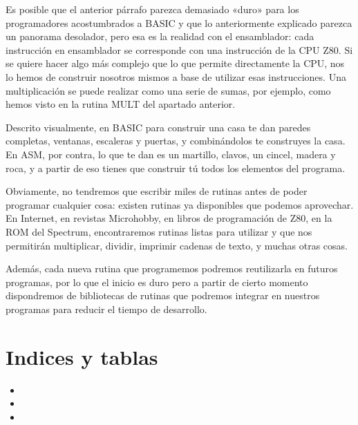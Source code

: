\documentclass[letterpaper,10pt,spanish]{sphinxmanual}
\begin{document}
Es posible que el anterior párrafo parezca demasiado «duro» para los programadores acostumbrados a BASIC y que lo anteriormente explicado parezca un panorama desolador, pero esa es la realidad con el ensamblador: cada instrucción en ensamblador se corresponde con una instrucción de la CPU Z80. Si se quiere hacer algo más complejo que lo que permite directamente la CPU, nos lo hemos de construir nosotros mismos a base de utilizar esas instrucciones. Una multiplicación se puede realizar como una serie de sumas, por ejemplo, como hemos visto en la rutina MULT del apartado anterior.

Descrito visualmente, en BASIC para construir una casa te dan paredes completas, ventanas, escaleras y puertas, y combinándolos te construyes la casa. En ASM, por contra, lo que te dan es un martillo, clavos, un cincel, madera y roca, y a partir de eso tienes que construir tú todos los elementos del programa.

Obviamente, no tendremos que escribir miles de rutinas antes de poder programar cualquier cosa: existen rutinas ya disponibles que podemos aprovechar. En Internet, en revistas Microhobby, en libros de programación de Z80, en la ROM del Spectrum, encontraremos rutinas listas para utilizar y que nos permitirán multiplicar, dividir, imprimir cadenas de texto, y muchas otras cosas.

Además, cada nueva rutina que programemos podremos reutilizarla en futuros programas, por lo que el inicio es duro pero a partir de cierto momento dispondremos de bibliotecas de rutinas que podremos integrar en nuestros programas para reducir el tiempo de desarrollo.


\chapter{Indices y tablas}
\label{\detokenize{index:indices-y-tablas}}\begin{itemize}
\item {} 

\item {} 

\item {} 

\end{itemize}



\renewcommand{\indexname}{Índice}
\printindex
\end{document}
